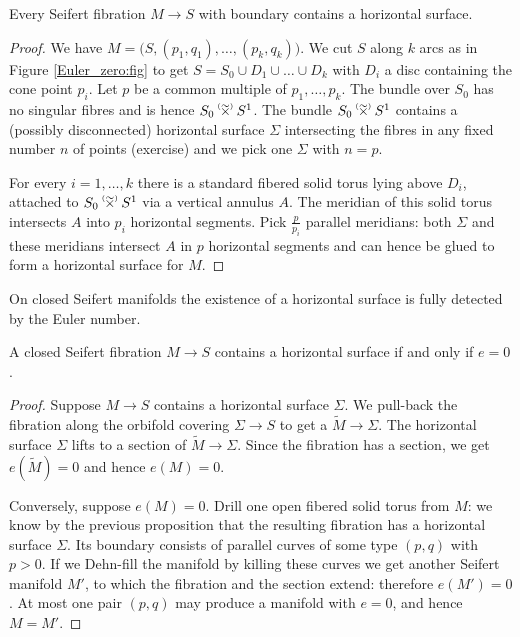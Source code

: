 \begin{prop}
Every Seifert fibration $M\to S$ with boundary contains a horizontal surface.
\end{prop}
\begin{proof}
We have $M=\big(S,(p_1,q_1),\ldots,(p_k,q_k)\big)$. We cut $S$ along 
$k$ arcs as in Figure \ref{Euler_zero:fig} to get $S=S_0\cup D_1\cup\ldots \cup D_k$ with $D_i$ a disc containing the cone point $p_i$. Let $p$ be a common multiple of $p_1,\ldots, p_k$. The bundle over $S_0$ has no singular fibres and is hence $S_0\timforsetil S^1$. The bundle $S_0\timforsetil S^1$ contains a (possibly disconnected) horizontal surface $\Sigma$ intersecting the fibres in any fixed number $n$ of points (exercise) and we pick one $\Sigma$ with $n=p$.

For every $i=1,\ldots, k$ there is a standard fibered solid torus lying above $D_i$, attached to $S_0 \timforsetil S^1$ via a vertical annulus $A$. The meridian of this solid torus intersects $A$ into $p_i$ horizontal segments. Pick $\frac{p}{p_i}$ parallel meridians: both $\Sigma$ and these meridians intersect $A$ in $p$ horizontal segments and can hence be glued to form a horizontal surface for $M$.
\end{proof}

On closed Seifert manifolds the existence of a horizontal surface is fully detected by the Euler number.

\begin{prop}
A closed Seifert fibration $M \to S$ contains a horizontal surface if and only if $e=0$.
\end{prop}
\begin{proof}
Suppose $M\to S$ contains a horizontal surface $\Sigma$. We pull-back the fibration along the orbifold covering $\Sigma \to S$ to get a $\tilde M \to \Sigma$. The horizontal surface $\Sigma$ lifts to a section of $\tilde M \to \Sigma$. Since the fibration has a section, we get $e(\tilde M) = 0$ and hence $e(M) = 0 $.

Conversely, suppose $e(M)=0$. Drill one open fibered solid torus from $M$: we know by the previous proposition that the resulting fibration has a horizontal surface $\Sigma$. Its boundary consists of parallel curves of some type $(p,q)$ with $p>0$. If we Dehn-fill the manifold by killing these curves we get another Seifert manifold $M'$, to which the fibration and the section extend: therefore $e(M')=0$. At most one pair $(p,q)$ may produce a manifold with $e=0$, and hence $M=M'$.
\end{proof}

